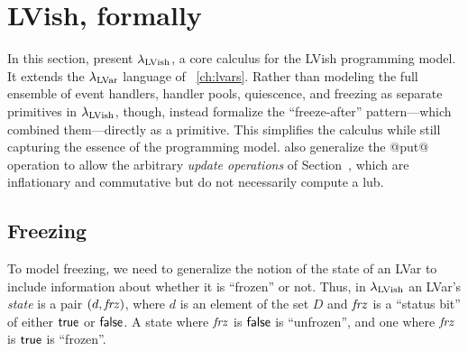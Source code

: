 \section{LVish, formally}\label{s:quasi-formal}

In this section,  present $\lambda_{\textrm{LVish}}$, a core calculus for the
LVish programming model. It extends the $\lambda_{\textrm{LVar}}$ language of
~\ref{ch:lvars}. Rather than
modeling the full ensemble of event handlers, handler pools,
quiescence, and freezing as separate primitives in $\lambda_{\textrm{LVish}}$, though,
 instead formalize
the ``freeze-after'' pattern---which combined them---directly as a
primitive.  This simplifies the calculus while still capturing the
essence of the programming model.   also generalize the @put@
operation to allow the arbitrary \emph{update operations} of Section~\either{\ref{subsection:lvars-generalizing-from-least-upper-bound-writes}}{\ref{s:lvars-generalizing}},
which are inflationary and commutative but do not necessarily compute
a lub.

\subsection{Freezing}

To model freezing, we need to generalize the notion of the state of an
LVar to include information about whether it is ``frozen'' or not.
Thus, in $\lambda_{\textrm{LVish}}$ an LVar's \emph{state} is a pair
$(d, \mathit{frz})$, where $d$ is an element of the set $D$ and $\mathit{frz}$ is a ``status bit'' of
either $\textsf{true}$ or $\textsf{false}$.  A state where $\mathit{frz}$ is
$\textsf{false}$ is ``unfrozen'', and one where $\mathit{frz}$ is
$\textsf{true}$ is ``frozen''.

